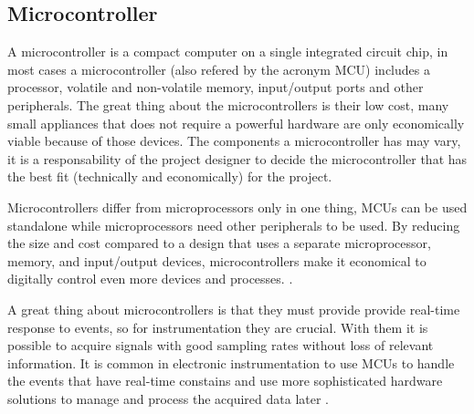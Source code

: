 \subsection{Microcontroller}

A microcontroller is a compact computer on a single integrated circuit chip, in most cases a microcontroller (also refered by the acronym MCU) includes a processor, volatile and non-volatile memory, input/output ports and other peripherals. The great thing about the microcontrollers is their low cost, many small appliances that does not require a powerful hardware are only economically viable because of those devices. The components a microcontroller has may vary, it is a responsability of the project designer to decide the microcontroller that has the best fit (technically and economically) for the project.
	\par
	Microcontrollers differ from microprocessors only in one thing, MCUs can be used standalone while microprocessors need other peripherals to be used. By reducing the size and cost compared to a design that uses a separate microprocessor, memory, and input/output devices, microcontrollers make it economical to digitally control even more devices and processes. \cite{mcuDef}.
	\par
	A great thing about microcontrollers is that they must provide provide real-time response to events, so for instrumentation they are crucial. With them it is possible to acquire signals with good sampling rates without loss of relevant information. It is common in electronic instrumentation to use MCUs to handle the events that have real-time constains and use more sophisticated hardware solutions to manage and process the acquired data later \cite{bartz2004data}.
